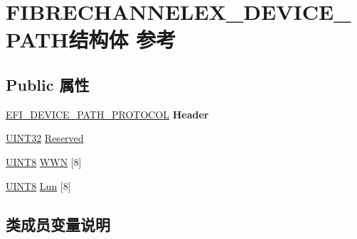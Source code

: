 \hypertarget{struct_f_i_b_r_e_c_h_a_n_n_e_l_e_x___d_e_v_i_c_e___p_a_t_h}{}\section{F\+I\+B\+R\+E\+C\+H\+A\+N\+N\+E\+L\+E\+X\+\_\+\+D\+E\+V\+I\+C\+E\+\_\+\+P\+A\+T\+H结构体 参考}
\label{struct_f_i_b_r_e_c_h_a_n_n_e_l_e_x___d_e_v_i_c_e___p_a_t_h}
\subsection*{Public 属性}
\begin{DoxyCompactItemize}
\item 
\mbox{\label{struct_f_i_b_r_e_c_h_a_n_n_e_l_e_x___d_e_v_i_c_e___p_a_t_h_ab7185a0d8658c5ce7a1ff45088935ac1}} 
\hyperlink{struct_e_f_i___d_e_v_i_c_e___p_a_t_h___p_r_o_t_o_c_o_l}{E\+F\+I\+\_\+\+D\+E\+V\+I\+C\+E\+\_\+\+P\+A\+T\+H\+\_\+\+P\+R\+O\+T\+O\+C\+OL} {\bfseries Header}
\item 
\hyperlink{_processor_bind_8h_ae1e6edbbc26d6fbc71a90190d0266018}{U\+I\+N\+T32} \hyperlink{struct_f_i_b_r_e_c_h_a_n_n_e_l_e_x___d_e_v_i_c_e___p_a_t_h_ad7f10c16b289f600beb068ddafc643e2}{Reserved}
\item 
\hyperlink{_processor_bind_8h_ab27e9918b538ce9d8ca692479b375b6a}{U\+I\+N\+T8} \hyperlink{struct_f_i_b_r_e_c_h_a_n_n_e_l_e_x___d_e_v_i_c_e___p_a_t_h_a8eb313a71e7e69dcd87c223dccf07602}{W\+WN} \mbox{[}8\mbox{]}
\item 
\hyperlink{_processor_bind_8h_ab27e9918b538ce9d8ca692479b375b6a}{U\+I\+N\+T8} \hyperlink{struct_f_i_b_r_e_c_h_a_n_n_e_l_e_x___d_e_v_i_c_e___p_a_t_h_abca6ca2abef1239d02a0ade99642335a}{Lun} \mbox{[}8\mbox{]}
\end{DoxyCompactItemize}


\subsection{类成员变量说明}
\mbox{\label{struct_f_i_b_r_e_c_h_a_n_n_e_l_e_x___d_e_v_i_c_e___p_a_t_h_abca6ca2abef1239d02a0ade99642335a}} 
